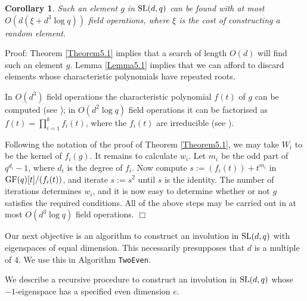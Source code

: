 \documentclass[12pt]{article}
\newtheorem{corollary}[definition]{Corollary}
\newenvironment{proof}{\normalsize {\sc Proof}:}{{\hfill $\Box$ \\}}
\def\SL{{\rm SL}}
\def\GF{{\rm GF}}
\begin{document}
\begin{corollary}\label{Corollary5.1} Such an element $g$ in $\SL(d,q)$ 
can be found with at most $O(d(\xi + d^3\log q))$ field operations,
where $\xi$ is the cost of constructing a random element.
\end{corollary}

\begin{proof}
Theorem \ref{Theorem5.1} implies that a search of length $O(d)$ 
will find such an element $g$. 
Lemma \ref{Lemma5.1} implies that we can
afford to discard elements whose characteristic   
polynomials have repeated roots. 

In $O(d^3)$ field operations 
the characteristic polynomial $f(t)$ of $g$ can be
computed (see \cite[Section 7.2]{HoltEickOBrien05}); 
in $O(d^2 \log q)$ field operations it can be factorised as 
$f(t)=\prod_{i=1}^kf_i(t)$, where the $f_i(t)$ are irreducible 
(see \cite[Theorem 14.14]{vzg}).

Following the notation of the proof of Theorem \ref{Theorem5.1},  
we may take $W_i$ to be the
kernel of $f_i(g)$. It remains to calculate $w_i$. Let $m_i$ be the
odd part of $q^{d_i}-1$, where $d_i$ is the degree of $f_i$. Now
compute $s :=(f_i(t))+t^{m_i}$ in $\GF(q)[t]/(f_i(t))$, and iterate 
$s := s^2$  until $s$ is the identity. The number of iterations
determines $w_i$, and it is now easy to determine whether or not $g$
satisfies the required conditions. All of the above steps may be carried
out in at most $O(d^3 \log q)$ field operations. 
\end{proof}

Our next objective is an algorithm 
to construct an involution in
$\SL(d,q)$ with eigenspaces of equal dimension. This necessarily
presupposes that $d$ is a multiple of $4$. 
We use this in Algorithm {\tt TwoEven}. 

We describe a recursive procedure to construct an 
involution in $\SL(d, q)$ whose $-1$-eigenspace has a specified 
even dimension $e$. 
\end{document}

